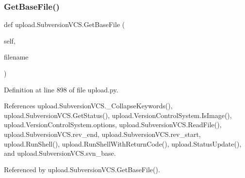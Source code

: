 \mbox{\label{classupload_1_1SubversionVCS_a29dec4941de0824734d6842a2f33ffc3}} 
\subsubsection{\texorpdfstring{Get\+Base\+File()}{GetBaseFile()}\hspace{0.1cm}{\footnotesize\ttfamily [1/2]}}
{\footnotesize\ttfamily def upload.\+Subversion\+V\+C\+S.\+Get\+Base\+File (\begin{DoxyParamCaption}\item[{}]{self,  }\item[{}]{filename }\end{DoxyParamCaption})}



Definition at line 898 of file upload.\+py.



References upload.\+Subversion\+V\+C\+S.\+\_\+\+Collapse\+Keywords(), upload.\+Subversion\+V\+C\+S.\+Get\+Status(), upload.\+Version\+Control\+System.\+Is\+Image(), upload.\+Version\+Control\+System.\+options, upload.\+Subversion\+V\+C\+S.\+Read\+File(), upload.\+Subversion\+V\+C\+S.\+rev\+\_\+end, upload.\+Subversion\+V\+C\+S.\+rev\+\_\+start, upload.\+Run\+Shell(), upload.\+Run\+Shell\+With\+Return\+Code(), upload.\+Status\+Update(), and upload.\+Subversion\+V\+C\+S.\+svn\+\_\+base.



Referenced by upload.\+Subversion\+V\+C\+S.\+Get\+Base\+File().


